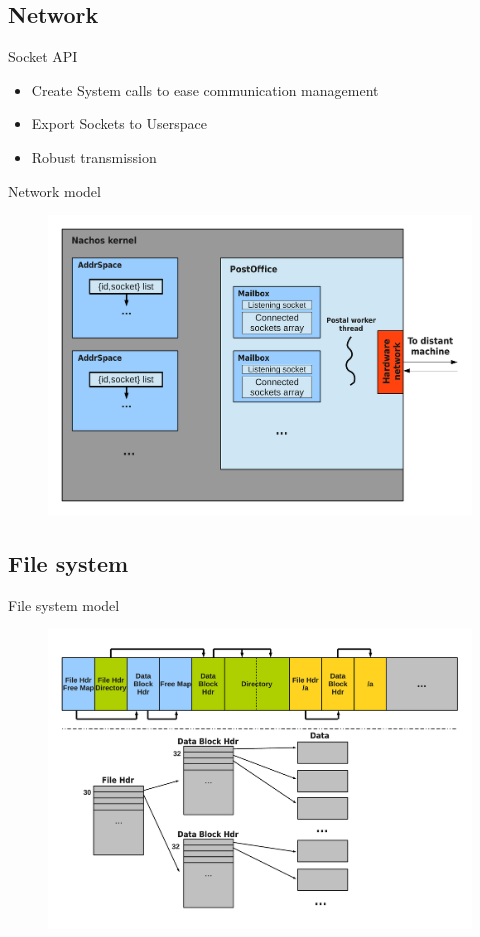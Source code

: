 \documentclass{beamer}
\begin{document}
\subsection{Network}

\begin{frame}{Socket API}
    \begin{itemize}
        \item Create System calls to ease communication management
        \item Export Sockets to Userspace
        \item Robust transmission
    \end{itemize}
\end{frame}

\begin{frame}{Network model}
    \begin{figure}[ht]
        \includegraphics[width=0.9\linewidth]{Networkcolored.pdf}
    \end{figure}
\end{frame}

\subsection{File system}
\begin{frame}{File system model}
    \begin{figure}[ht]
        \includegraphics[width=0.9\linewidth]{filesystem.pdf}
    \end{figure}
\end{frame}
\end{document}
